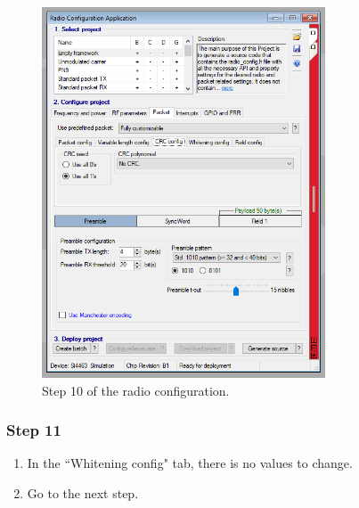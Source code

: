 \begin{figure}[!h]
	\begin{center}
		\includegraphics[width=0.75\textwidth]{figures/wds-tutorial/wds-tutorial-10.png}
		\caption{Step 10 of the radio configuration.}
		\label{fig:wds-tutorial-step-10}
	\end{center}
\end{figure}

\subsubsection{Step 11}

\begin{enumerate}
    \item In the ``Whitening config" tab, there is no values to change.
    \item Go to the next step.
\end{enumerate}

